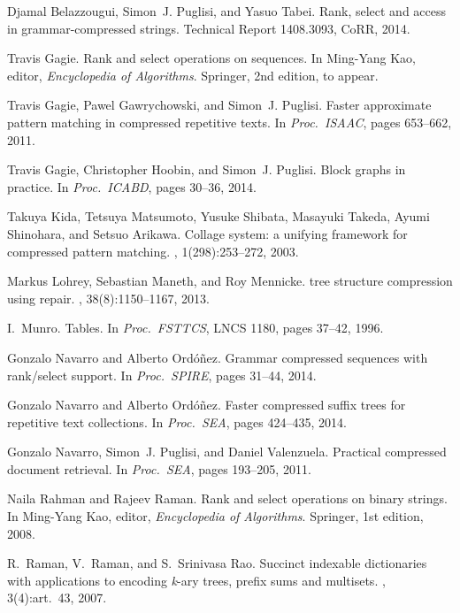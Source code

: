 \documentclass[12pt]{article}
\begin{document}
\begin{thebibliography}{10}

Djamal Belazzougui, Simon~J. Puglisi, and Yasuo Tabei.
\newblock Rank, select and access in grammar-compressed strings.
\newblock Technical Report 1408.3093, CoRR, 2014.
 
Travis Gagie.
\newblock Rank and select operations on sequences.
\newblock In Ming{-}Yang Kao, editor, {\em Encyclopedia of Algorithms}.
  Springer, 2nd edition, to appear.
 
Travis Gagie, Pawel Gawrychowski, and Simon~J. Puglisi.
\newblock Faster approximate pattern matching in compressed repetitive texts.
\newblock In {\em Proc.\ ISAAC}, pages 653--662, 2011.
 
Travis Gagie, Christopher Hoobin, and Simon~J. Puglisi.
\newblock Block graphs in practice.
\newblock In {\em Proc.\ ICABD}, pages 30--36, 2014.
 
Takuya Kida, Tetsuya Matsumoto, Yusuke Shibata, Masayuki Takeda, Ayumi
  Shinohara, and Setsuo Arikawa.
\newblock Collage system: a unifying framework for compressed pattern matching.
, 1(298):253--272, 2003.
 
Markus Lohrey, Sebastian Maneth, and Roy Mennicke.
 tree structure compression using repair.
, 38(8):1150--1167, 2013.
 
I.~Munro.
\newblock Tables.
\newblock In {\em Proc.\ FSTTCS}, LNCS 1180, pages 37--42, 1996.
 
Gonzalo Navarro and Alberto Ord{\'o}{\~n}ez.
\newblock Grammar compressed sequences with rank/select support.
\newblock In {\em Proc.\ SPIRE}, pages 31--44, 2014.
 
Gonzalo Navarro and Alberto Ord{\'o}{\~n}ez.
\newblock Faster compressed suffix trees for repetitive text collections.
\newblock In {\em Proc.\ SEA}, pages 424--435, 2014.
 
Gonzalo Navarro, Simon~J. Puglisi, and Daniel Valenzuela.
\newblock Practical compressed document retrieval.
\newblock In {\em Proc.\ SEA}, pages 193--205, 2011.
 
Naila Rahman and Rajeev Raman.
\newblock Rank and select operations on binary strings.
\newblock In Ming{-}Yang Kao, editor, {\em Encyclopedia of Algorithms}.
  Springer, 1st edition, 2008.
 
R.~Raman, V.~Raman, and S.~Srinivasa Rao.
\newblock Succinct indexable dictionaries with applications to encoding {\it
  k}-ary trees, prefix sums and multisets.
, 3(4):art.~43, 2007.

\end{thebibliography}
\end{document}
